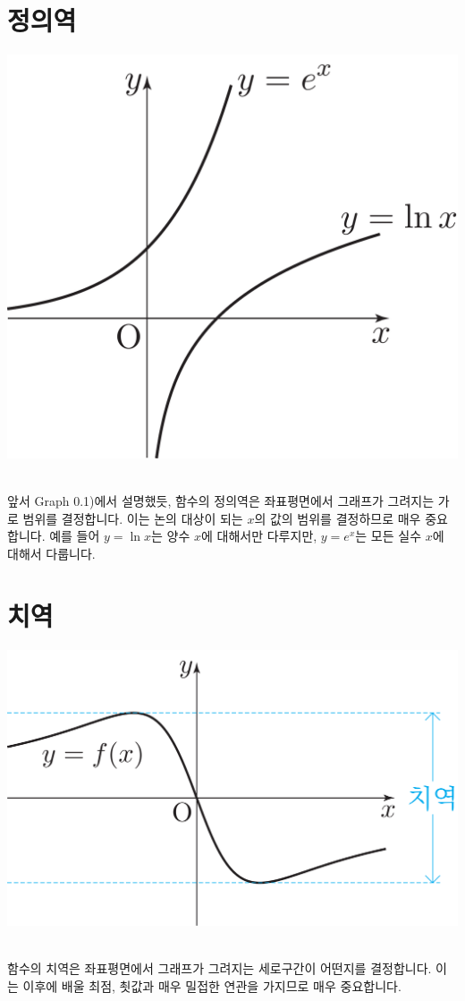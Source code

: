 \section{정의역}
\begin{center} \includegraphics[scale=\pgfkeysvalueof{picsize}]{DBs/pic/zery_09.pdf}\
	\end{center}앞서 Graph 0.1)에서 설명했듯, 함수의 정의역은 좌표평면에서 그래프가 그려지는 가로 범위를 결정합니다. 이는 논의 대상이 되는 $x$의 값의 범위를 결정하므로 매우 중요합니다. 예를 들어 $y=\ln x$는 양수 $x$에 대해서만 다루지만, $y=e^x$는 모든 실수 $x$에 대해서 다룹니다.

\section{치역}
\begin{center} \includegraphics[scale=\pgfkeysvalueof{picsize}]{DBs/pic/zery_10.pdf}\
	\end{center}함수의 치역은 좌표평면에서 그래프가 그려지는 세로구간이 어떤지를 결정합니다. 이는 이후에 배울 최점, 쵯값과 매우 밀접한 연관을 가지므로 매우 중요합니다. 

